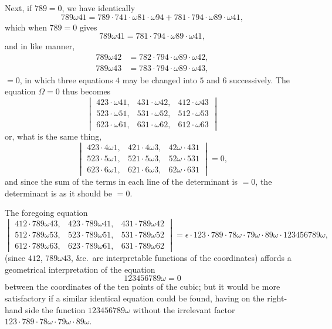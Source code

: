\documentclass[11pt,a4paper]{book}
\begin{document}
\newpage
\setcounter{page}{504}

Next, if $789 = 0$, we have identically
\[
789\omega 41 = 789 \cdot 741 \cdot \omega 81 \cdot \omega 94 + 781 \cdot 794 \cdot \omega 89 \cdot \omega 41,
\]
which when $789 = 0$ gives
\[
789\omega 41 = 781 \cdot 794 \cdot \omega 89 \cdot \omega 41,
\]
and in like manner,
\begin{align*}
789\omega 42 &= 782 \cdot 794 \cdot \omega 89 \cdot \omega 42,\\
789\omega 43 &= 783 \cdot 794 \cdot \omega 89 \cdot \omega 43,
\end{align*}
$= 0$, in which three equations $4$ may be changed into $5$ and $6$ successively. The equation $\Omega = 0$ thus becomes
\[
\begin{vmatrix}
423 \cdot \omega 41, & 431 \cdot \omega 42, & 412 \cdot \omega 43\\
523 \cdot \omega 51, & 531 \cdot \omega 52, & 512 \cdot \omega 53\\
623 \cdot \omega 61, & 631 \cdot \omega 62, & 612 \cdot \omega 63
\end{vmatrix}
\]
or, what is the same thing,
\[
\begin{vmatrix}
423 \cdot 4\omega 1, & 421 \cdot 4\omega 3, & 42\omega \cdot 431\\
523 \cdot 5\omega 1, & 521 \cdot 5\omega 3, & 52\omega \cdot 531\\
623 \cdot 6\omega 1, & 621 \cdot 6\omega 3, & 62\omega \cdot 631
\end{vmatrix}
= 0,
\]
and since the sum of the terms in each line of the determinant is $=0$, the determinant is as it should be $= 0$.

The foregoing equation
\[
\begin{vmatrix}
412 \cdot 789\omega 43, & 423 \cdot 789\omega 41, & 431 \cdot 789\omega 42\\
512 \cdot 789\omega 53, & 523 \cdot 789\omega 51, & 531 \cdot 789\omega 52\\
612 \cdot 789\omega 63, & 623 \cdot 789\omega 61, & 631 \cdot 789\omega 62
\end{vmatrix}
= \epsilon \cdot 123 \cdot 789 \cdot 78\omega \cdot 79\omega \cdot 89\omega \cdot 123456789\omega,
\]
(since $412$, $789\omega 43$, \&c.\ are interpretable functions of the coordinates) affords a geometrical interpretation of the equation
\[
123456789\omega = 0
\]
between the coordinates of the ten points of the cubic; but it would be more satisfactory if a similar identical equation could be found, having on the right-hand side the function $123456789\omega$ without the irrelevant factor $123 \cdot 789 \cdot 78\omega \cdot 79\omega \cdot 89\omega$.
\end{document}
